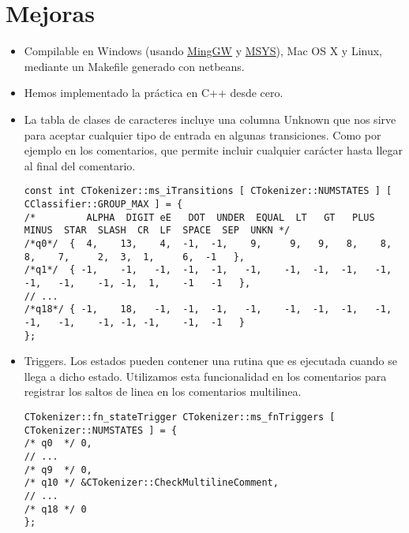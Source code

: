 
\chapter{Mejoras}

\begin{itemize}

    \item Compilable en Windows (usando \href{http://www.mingw.org/}{MingGW} y \href{http://www.mingw.org/wiki/MSYS}{MSYS}), Mac OS X y Linux, mediante un Makefile generado con netbeans.

    \item Hemos implementado la práctica en C++ desde cero.
    
    \item La tabla de clases de caracteres incluye una columna Unknown que nos sirve para aceptar cualquier tipo de entrada en algunas transiciones. Como por ejemplo en los comentarios, que permite incluir cualquier carácter hasta llegar al final del comentario.

        \begin{lstlisting}[caption={Estructura usada para definir los transiciones},basicstyle=\tiny] 
const int CTokenizer::ms_iTransitions [ CTokenizer::NUMSTATES ] [ CClassifier::GROUP_MAX ] = {
/*         ALPHA  DIGIT eE   DOT  UNDER  EQUAL  LT   GT   PLUS  MINUS  STAR  SLASH  CR  LF  SPACE  SEP  UNKN */
/*q0*/  {  4,    13,    4,  -1,  -1,    9,     9,   9,   8,    8,     8,    7,     2,  3,  1,     6,  -1   },
/*q1*/  { -1,    -1,   -1,  -1,  -1,   -1,    -1,  -1,  -1,   -1,    -1,   -1,    -1, -1,  1,    -1   -1   },
// ...
/*q18*/ { -1,    18,   -1,  -1,  -1,   -1,    -1,  -1,  -1,   -1,    -1,   -1,    -1, -1, -1,    -1,  -1   }
};
        \end{lstlisting}

    \item Triggers. Los estados pueden contener una rutina que es ejecutada cuando se llega a dicho estado. Utilizamos esta funcionalidad en los comentarios para registrar los saltos de linea en los comentarios multilinea.
    
        \begin{lstlisting}[caption={Estructura utilizada para declarar los triggers asociados a cada estado}]
CTokenizer::fn_stateTrigger CTokenizer::ms_fnTriggers [ CTokenizer::NUMSTATES ] = {
/* q0  */ 0,
// ...
/* q9  */ 0,
/* q10 */ &CTokenizer::CheckMultilineComment,
// ...
/* q18 */ 0
};
        \end{lstlisting}


\end{itemize}
